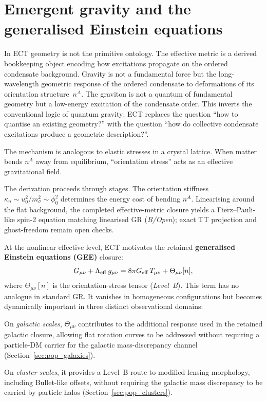 \documentclass[11pt,a4paper]{article}
\begin{document}
\section{Emergent gravity and the generalised Einstein equations}
\label{sec:pop_gravity}

In ECT geometry is not the primitive ontology. The effective metric is a derived bookkeeping object encoding how excitations propagate on the ordered condensate background. Gravity is not a fundamental force but the long-wavelength geometric response of the ordered condensate to deformations of its orientation structure~$n^A$. The graviton is not a quantum of fundamental geometry but a low-energy excitation of the condensate order. This inverts the conventional logic of quantum gravity: ECT replaces the question ``how to quantise an existing geometry?'' with the question ``how do collective condensate excitations produce a geometric description?''.

The mechanism is analogous to elastic stresses in a crystal lattice. When matter bends $n^A$ away from equilibrium, ``orientation stress'' acts as an effective gravitational field.

The derivation proceeds through stages. The orientation stiffness $\kappa_n \sim u_0^2/m_\sigma^2 \sim \phi_0^2$ determines the energy cost of bending $n^A$. Linearising around the flat background, the completed effective-metric closure yields a Fierz--Pauli-like spin-2 equation matching linearised GR (\emph{B/Open}); exact TT projection and ghost-freedom remain open checks.

At the nonlinear effective level, ECT motivates the retained \textbf{generalised Einstein equations (GEE)} closure:
\begin{equation}
  G_{\mu\nu} + \Lambda_{\rm eff}\,g_{\mu\nu}
  = 8\pi G_{\rm eff}\,T_{\mu\nu} + \Theta_{\mu\nu}[n],
  \label{eq:pop_gee}
\end{equation}
where $\Theta_{\mu\nu}[n]$ is the orientation-stress tensor (\emph{Level~B}). This term has no analogue in standard GR. It vanishes in homogeneous configurations but becomes dynamically important in three distinct observational domains:

On \emph{galactic scales}, $\Theta_{\mu\nu}$ contributes to the additional response used in the retained galactic closure, allowing flat rotation curves to be addressed without requiring a particle-DM carrier for the galactic mass-discrepancy channel (Section~\ref{sec:pop_galaxies}).

On \emph{cluster scales}, it provides a Level~B route to modified lensing morphology, including Bullet-like offsets, without requiring the galactic mass discrepancy to be carried by particle halos (Section~\ref{sec:pop_clusters}).
\end{document}
